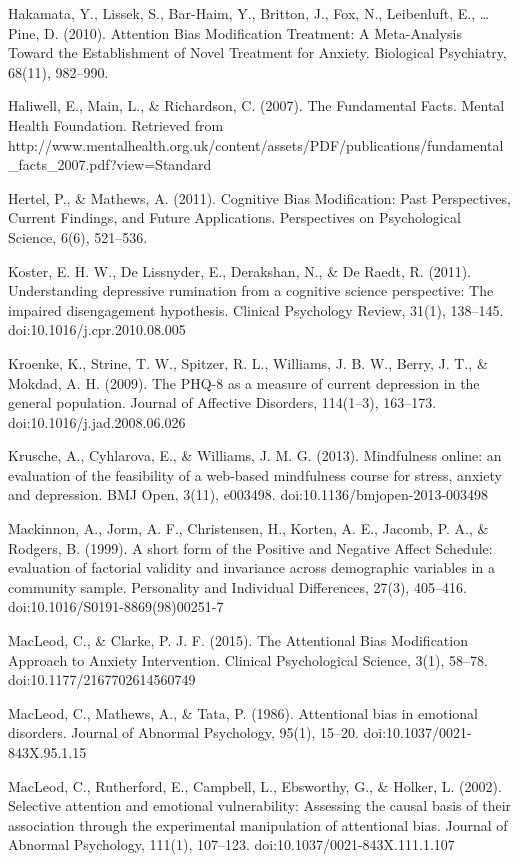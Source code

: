 \documentclass[man,a4paper,biblatex]{apa6}
\begin{document}
Hakamata, Y., Lissek, S., Bar-Haim, Y., Britton, J., Fox, N., Leibenluft, E., {\dots} Pine, D. (2010). Attention Bias Modification Treatment: A Meta-Analysis Toward the Establishment of Novel Treatment for Anxiety. Biological Psychiatry, 68(11), 982--990.

Haliwell, E., Main, L., \& Richardson, C. (2007). The Fundamental Facts. Mental Health Foundation. Retrieved from http://www.mentalhealth.org.uk/content/assets/PDF/publications/fundamental\_facts\_2007.pdf?view=Standard

Hertel, P., \& Mathews, A. (2011). Cognitive Bias Modification: Past Perspectives, Current Findings, and Future Applications. Perspectives on Psychological Science, 6(6), 521--536.

Koster, E. H. W., De Lissnyder, E., Derakshan, N., \& De Raedt, R. (2011). Understanding depressive rumination from a cognitive science perspective: The impaired disengagement hypothesis. Clinical Psychology Review, 31(1), 138--145. doi:10.1016/j.cpr.2010.08.005

Kroenke, K., Strine, T. W., Spitzer, R. L., Williams, J. B. W., Berry, J. T., \& Mokdad, A. H. (2009). The PHQ-8 as a measure of current depression in the general population. Journal of Affective Disorders, 114(1--3), 163--173. doi:10.1016/j.jad.2008.06.026

Krusche, A., Cyhlarova, E., \& Williams, J. M. G. (2013). Mindfulness online: an evaluation of the feasibility of a web-based mindfulness course for stress, anxiety and depression. BMJ Open, 3(11), e003498. doi:10.1136/bmjopen-2013-003498

Mackinnon, A., Jorm, A. F., Christensen, H., Korten, A. E., Jacomb, P. A., \& Rodgers, B. (1999). A short form of the Positive and Negative Affect Schedule: evaluation of factorial validity and invariance across demographic variables in a community sample. Personality and Individual Differences, 27(3), 405--416. doi:10.1016/S0191-8869(98)00251-7

MacLeod, C., \& Clarke, P. J. F. (2015). The Attentional Bias Modification Approach to Anxiety Intervention. Clinical Psychological Science, 3(1), 58--78. doi:10.1177/2167702614560749

MacLeod, C., Mathews, A., \& Tata, P. (1986). Attentional bias in emotional disorders. Journal of Abnormal Psychology, 95(1), 15--20. doi:10.1037/0021-843X.95.1.15

MacLeod, C., Rutherford, E., Campbell, L., Ebsworthy, G., \& Holker, L. (2002). Selective attention and emotional vulnerability: Assessing the causal basis of their association through the experimental manipulation of attentional bias. Journal of Abnormal Psychology, 111(1), 107--123. doi:10.1037/0021-843X.111.1.107
\end{document}

